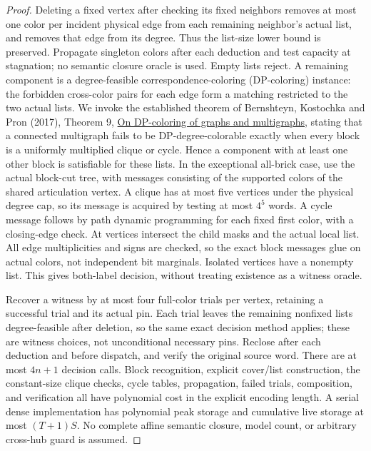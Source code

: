 \documentclass[11pt]{article}
\begin{document}
\begin{proof}
Deleting a fixed vertex after checking its fixed neighbors removes at most one color per incident physical edge from each remaining neighbor's actual list, and removes that edge from its degree. Thus the list-size lower bound is preserved. Propagate singleton colors after each deduction and test capacity at stagnation; no semantic closure oracle is used. Empty lists reject. A remaining component is a degree-feasible correspondence-coloring (DP-coloring) instance: the forbidden cross-color pairs for each edge form a matching restricted to the two actual lists. We invoke the established theorem of Bernshteyn, Kostochka and Pron (2017), Theorem 9, \href{https://doi.org/10.1134/S0037446617010049}{On DP-coloring of graphs and multigraphs}, stating that a connected multigraph fails to be DP-degree-colorable exactly when every block is a uniformly multiplied clique or cycle. Hence a component with at least one other block is satisfiable for these lists. In the exceptional all-brick case, use the actual block-cut tree, with messages consisting of the supported colors of the shared articulation vertex. A clique has at most five vertices under the physical degree cap, so its message is acquired by testing at most $4^5$ words. A cycle message follows by path dynamic programming for each fixed first color, with a closing-edge check. At vertices intersect the child masks and the actual local list. All edge multiplicities and signs are checked, so the exact block messages glue on actual colors, not independent bit marginals. Isolated vertices have a nonempty list. This gives both-label decision, without treating existence as a witness oracle.

Recover a witness by at most four full-color trials per vertex, retaining a successful trial and its actual pin. Each trial leaves the remaining nonfixed lists degree-feasible after deletion, so the same exact decision method applies; these are witness choices, not unconditional necessary pins. Reclose after each deduction and before dispatch, and verify the original source word. There are at most $4n+1$ decision calls. Block recognition, explicit cover/list construction, the constant-size clique checks, cycle tables, propagation, failed trials, composition, and verification all have polynomial cost in the explicit encoding length. A serial dense implementation has polynomial peak storage and cumulative live storage at most $(T+1)S$. No complete affine semantic closure, model count, or arbitrary cross-hub guard is assumed.
\end{proof}
\end{document}
